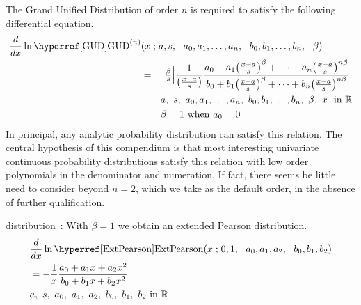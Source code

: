 

\label{sec:GUD}



The Grand Unified Distribution of order $n$ is required to satisfy the following differential equation.
\begin{align}
\label{GUD}
\frac{d}{dx} \ln  \opr{GUD}^{(n)}&(x\given a, s \sep a_0, a_1,\ldots,a_n\sep  b_0,b_1,\ldots, b_n\sep \beta)
\checked \\
&= -\Left|\tfrac{\beta}{s}\Right| \frac{1}{\bigl(\tfrac{x-a}{s}\bigr)} \frac{a_0  +a_1 \bigl(\tfrac{x-a}{s}\bigr)^{\beta}+\cdots +a_n \bigl(\tfrac{x-a}{s}\bigr)^{n\beta}}{b_0+ b_1 \bigl(\tfrac{x-a}{s}\bigr)^{\beta}+\cdots+b_n\bigl(\tfrac{x-a}{s}\bigr)^{n\beta}  } 
\notag
\checked
\\
& \qquad  a,\ s,\  a_0,a_1,\ldots,a_n,\ b_0,b_1, \ldots, b_n,\ \beta,\ x\  \text{ in } \mathbb{R} 
\checked
\notag
\\ \notag
& \qquad \beta = 1 \text{ when } a_0 =0
\checked
\end{align}
In principal, any analytic probability distribution can satisfy this relation.
The central hypothesis of this compendium is that most interesting univariate continuous probability distributions satisfy this relation with low order polynomials in the denominator and numeration. If fact, there seems be little need to consider beyond $n=2$, which we take as the default order, in the absence of further qualification. 




 distribution~\cite{Roy1971}: With $\beta=1$ we obtain an extended Pearson distribution.
\begin{align}
\label{ExtPearson}
&\frac{d}{dx} \ln  \opr{ExtPearson}(x\given 0, 1\sep a_0, a_1, a_2\sep b_0, b_1, b_2) \checked \\
\notag
&= - \frac{1}{x} \frac{a_0 +a_1 x+ a_2 x^2}{b_0+ b_1 x+  b_2 x^2  } \\
\notag
& a,\ s,\ a_0,\ a_1,\ a_2,\ b_0,\ b_1,\ b_2 \text{ in } \Real
\end{align}



